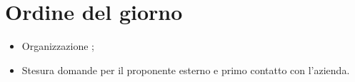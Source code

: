 \section{Ordine del giorno}
\begin{itemize}
\item Organizzazione \Glossario ;
\item Stesura domande per il proponente esterno e primo contatto con l'azienda.
\end{itemize}
